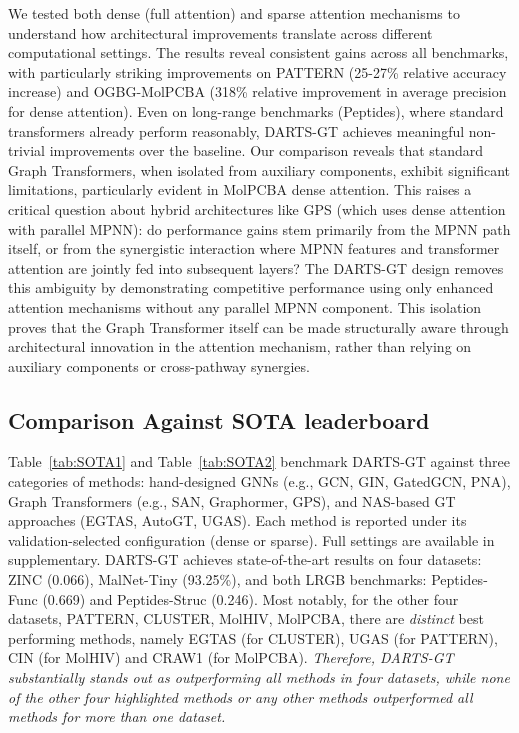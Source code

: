 \documentclass[lettersize,journal]{IEEEtran}
\begin{document}
We tested both dense (full attention) and sparse attention mechanisms to understand how architectural improvements translate across different computational settings. The results reveal consistent gains across all benchmarks, with particularly striking improvements on PATTERN (25-27\% relative accuracy increase) and OGBG-MolPCBA (318\% relative improvement in average precision for dense attention). Even on long-range benchmarks (Peptides), where standard transformers already perform reasonably, DARTS-GT achieves meaningful non-trivial improvements over the baseline. Our comparison reveals that standard Graph Transformers, when isolated from auxiliary components, exhibit significant limitations, particularly evident in MolPCBA dense attention. This raises a critical question about hybrid architectures like GPS (which uses dense attention with parallel MPNN): do performance gains stem primarily from the MPNN path itself, or from the synergistic interaction where MPNN features and transformer attention are jointly fed into subsequent layers? The DARTS-GT design removes this ambiguity by demonstrating competitive performance using only enhanced attention mechanisms without any parallel MPNN component. This isolation proves that the Graph Transformer itself can be made structurally aware through architectural innovation in the attention mechanism, rather than relying on auxiliary components or cross-pathway synergies.

\subsection{Comparison Against SOTA leaderboard}

Table~\ref{tab:SOTA1} and Table~\ref{tab:SOTA2} benchmark DARTS-GT against three categories of methods: hand-designed GNNs (e.g., GCN, GIN, GatedGCN, PNA), Graph Transformers (e.g., SAN, Graphormer, GPS), and NAS-based GT approaches (EGTAS, AutoGT, UGAS). Each method is reported under its validation-selected configuration (dense or sparse). Full settings are available in supplementary. DARTS-GT achieves state-of-the-art results on four datasets: ZINC (0.066), MalNet-Tiny (93.25\%), and both LRGB benchmarks: Peptides-Func (0.669) and Peptides-Struc (0.246). Most notably, for the other four datasets, PATTERN, CLUSTER, MolHIV, MolPCBA, there are \textit{distinct} best performing methods, namely EGTAS (for CLUSTER), UGAS (for PATTERN), CIN (for MolHIV) and CRAW1 (for MolPCBA).  \textit{Therefore, DARTS-GT substantially stands out as outperforming all methods in four datasets, while none of the other four highlighted methods or any other methods outperformed all methods for more than one dataset.}
\end{document}
